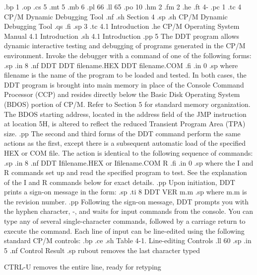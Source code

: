 
.bp 1 
.op
.cs 5
.mt 5
.mb 6
.pl 66
.ll 65
.po 10
.hm 2
.fm 2
.he 
.ft                                4-%
.pc 1                                
.tc 4  CP/M Dynamic Debugging Tool
.nf
.sh
                            Section 4
.sp
.sh
                   CP/M Dynamic Debugging Tool
.qs
.fi
.sp 3
.tc    4.1  Introduction
.he CP/M Operating System Manual                    4.1  Introduction
.sh
4.1  Introduction
.pp 5
The DDT program allows dynamic interactive testing and debugging of 
programs generated in the CP/M environment.  Invoke the debugger with 
a command of one of the following forms:
.sp
.in 8
.nf
DDT
DDT filename.HEX
DDT filename.COM
.fi
.in 0
.sp
where filename is the name of the program to be loaded and 
tested.  In both cases, the DDT program is brought into main 
memory in place of the Console Command Processor (CCP) and resides 
directly below the Basic Disk Operating System (BDOS) 
portion of CP/M.  Refer to Section 5 for standard memory 
organization.  The BDOS 
starting address, located in the address field of the 
JMP instruction at location 5H, is altered to reflect the 
reduced Transient Program Area (TPA) size.
.pp
The second and third forms of the DDT command perform the same 
actions as the first, except there is a subsequent automatic load 
of the specified HEX or COM file.  The action is identical to the 
following sequence of commands:
.sp 
.in 8
.nf
DDT
Ifilename.HEX or Ifilename.COM
R
.fi
.in 0
.sp 
where the I and R commands set up and read the specified program 
to test.  See the explanation of the I and R 
commands below for exact details.
.pp
Upon initiation, DDT prints a sign-on message in the form:
.sp
.ti 8
DDT VER m.m
.sp
where m.m is the revision number.
.pp
Following the sign-on message, DDT prompts you with the 
hyphen character, -, and waits for input commands from the 
console.  You can type any of several single-character commands, 
followed by a carriage return to execute the command.  Each 
line of input can be line-edited using the following standard 
CP/M controls:
.bp
.ce
.sh
Table 4-1.  Line-editing Controls
.ll 60
.sp
.in 5
.nf
Control                       Result
.sp
rubout      removes the last character typed

CTRL-U      removes the entire line, ready for retyping

